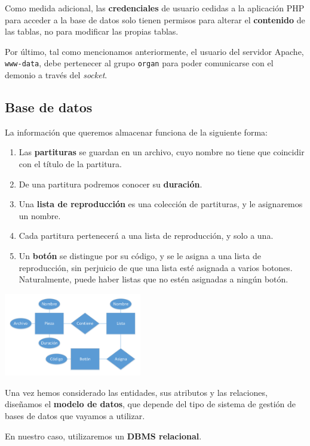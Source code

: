 \documentclass[10pt,a4paper]{article}
\begin{document}
	Como medida adicional, las \textbf{credenciales} de usuario cedidas a la aplicación PHP para acceder a la base de datos solo tienen permisos para alterar el \textbf{contenido} de las tablas, no para modificar las propias tablas.
	
	Por último, tal como mencionamos anteriormente, el usuario del servidor Apache, \verb|www-data|, debe pertenecer al grupo \verb|organ| para poder comunicarse con el demonio a través del \textit{socket}.
	
	\subsection{Base de datos}
	\label{subsec:database}
	
	La información que queremos almacenar funciona de la siguiente forma:
	
	\begin{enumerate}
		\item Las \textbf{partituras} se guardan en un archivo, cuyo nombre no tiene que coincidir con el título de la partitura.
		\item De una partitura podremos conocer su \textbf{duración}.
		\item Una \textbf{lista de reproducción} es una colección de partituras, y le asignaremos un nombre.
		\item Cada partitura pertenecerá a una lista de reproducción, y solo a una.
		\item Un \textbf{botón} se distingue por su código, y se le asigna a una lista de reproducción, sin perjuicio de que una lista esté asignada a varios botones. Naturalmente, puede haber listas que no estén asignadas a ningún botón.
	\end{enumerate}
	
	\begin{multicols}{2}
		\noindent
		\begin{center}
			\includegraphics[width=0.45\textwidth]{images/bd_er} 
		\end{center}
		\columnbreak
		Una vez hemos considerado las entidades, sus atributos y las relaciones, diseñamos el \textbf{modelo de datos}, que depende del tipo de sistema de gestión de bases de datos que vayamos a utilizar.
		
		En nuestro caso, utilizaremos un \textbf{DBMS relacional}.
	\end{multicols}
	
\end{document}
